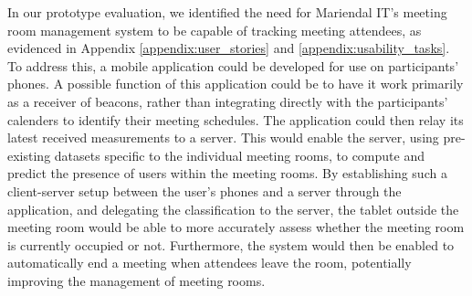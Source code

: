 In our prototype evaluation, we identified the need for Mariendal IT's meeting room management system to be capable of tracking meeting attendees, as evidenced in Appendix \ref{appendix:user_stories} and \ref{appendix:usability_tasks}. 
To address this, a mobile application could be developed for use on participants' phones.
A possible function of this application could be to have it work primarily as a receiver of beacons, rather than integrating directly with the participants' calenders to identify their meeting schedules.
The application could then relay its latest received measurements to a server. 
This would enable the server, using pre-existing datasets specific to the individual meeting rooms, to compute and predict the presence of users within the meeting rooms. 
By establishing such a client-server setup between the user's phones and a server through the application, and delegating the classification to the server, the tablet outside the meeting room would be able to more accurately assess whether the meeting room is currently occupied or not.
Furthermore, the system would then be enabled to automatically end a meeting when attendees leave the room, potentially improving the management of meeting rooms.


